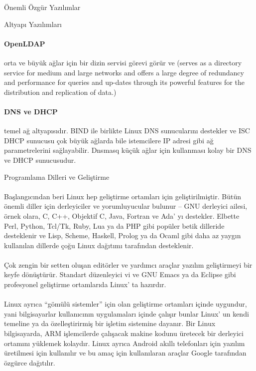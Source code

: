 \documentclass[10pt,a5paper]{book}
\begin{document}
\begin{section}{Önemli Özgür Yazılımlar}
\begin{subsection}{Altyapı Yazılımları}
\paragraph{OpenLDAP}{orta ve büyük ağlar için bir dizin servisi görevi görür ve (serves as a directory service for medium and large networks and offers a large degree of redundancy and performance for queries and up-dates through its powerful features for the distribution and replication of data.)}
\paragraph{DNS ve DHCP}{temel ağ altyapısıdır. BIND ile birlikte Linux DNS sunucularını destekler ve ISC DHCP sunucusu çok büyük ağlarda bile istemcilere IP adresi gibi ağ parametrelerini sağlayabilir. Dnsmasq küçük ağlar için kullanması kolay bir DNS ve DHCP sunucusudur.}
\end{subsection}
\begin{subsection}{Programlama Dilleri ve Geliştirme}
\paragraph{}{Başlangıcından beri Linux hep geliştirme ortamları için geliştirilmiştir. Bütün önemli diller için derleyiciler ve yorumluyucular bulunur – GNU derleyici ailesi, örnek olara, C, C++, Objektif C, Java, Fortran ve Ada' yı destekler. Elbette Perl, Python, Tcl/Tk, Ruby, Lua ya da PHP gibi popüler betik dilleride desteklenir ve Lisp, Scheme, Haskell, Prolog ya da Ocaml gibi daha az yaygın kullanılan dillerde çoğu Linux dağıtımı tarafından desteklenir.}
\paragraph{}{Çok zengin bir setten oluşan editörler ve yardımcı araçlar yazılım geliştirmeyi bir keyfe dönüştürür. Standart düzenleyici vi ve GNU Emacs ya da Eclipse gibi profesyonel geliştirme ortamlarıda Linux' ta hazırdır.}
\paragraph{}{Linux ayrıca “gömülü sistemler” için olan geliştirme ortamları içinde uygundur, yani bilgisayarlar kullanıcının uygulamaları içinde çalışır bunlar Linux' un kendi temeline ya da özelleştirirmiş bir işletim sistemine dayanır. Bir Linux bilgisayarda, ARM işlemcilerde çalışacak makine kodunu üretecek bir derleyici ortamını yüklemek kolaydır. Linux ayrıca Android akıllı telefonları için yazılım üretilmesi için kullanılır ve bu amaç için kullanılaran araçlar Google tarafından özgürce dağıtılır.}
\end{subsection}

\end{section}
\end{document}
